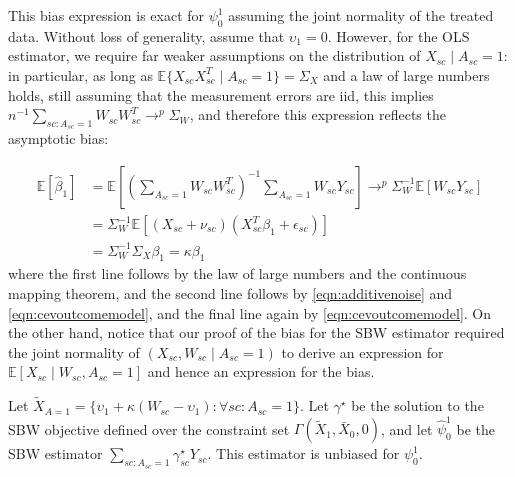 \begin{remark}  
    This bias expression is exact for $\psi_0^1$ assuming the joint normality of the treated data. Without loss of generality, assume that $\upsilon_1 = 0$. However, for the OLS estimator, we require far weaker assumptions on the distribution of $X_{sc} \mid A_{sc} = 1$: in particular, as long as $\mathbb{E}\{X_{sc}X_{sc}^T \mid A_{sc} = 1\} = \Sigma_X$ and a law of large numbers holds, still assuming that the measurement errors are iid, this implies $n^{-1}\sum_{sc: A_{sc} = 1}W_{sc}W_{sc}^T \to^p \Sigma_W$, and therefore this expression reflects the asymptotic bias: 
    
    \begin{align*}
    \mathbb{E}[\hat{\beta}_1] &= \mathbb{E}[(\sum_{A_{sc} = 1}W_{sc}W_{sc}^T)^{-1}\sum_{A_{sc} = 1}W_{sc}Y_{sc}] \to^p \Sigma_W^{-1}\mathbb{E}[W_{sc}Y_{sc}] \\ 
    &= \Sigma_W^{-1}\mathbb{E}[(X_{sc} + \nu_{sc})(X_{sc}^T\beta_1 + \epsilon_{sc})] \\
    &= \Sigma_W^{-1}\Sigma_X\beta_1 = \kappa \beta_1
    \end{align*}
    where the first line follows by the law of large numbers and the continuous mapping theorem, and the second line follows by \eqref{eqn:additivenoise} and \eqref{eqn:cevoutcomemodel}, and the final line again by \eqref{eqn:cevoutcomemodel}. On the other hand, notice that our proof of the bias for the SBW estimator required the joint normality of $(X_{sc}, W_{sc} \mid A_{sc} = 1)$ to derive an expression for $\mathbb{E}[X_{sc} \mid W_{sc}, A_{sc} = 1]$ and hence an expression for the bias.
\end{remark}

\begin{proposition}\label{cl2}
Let $\tilde{X}_{A=1} = \{\upsilon_1 + \kappa (W_{sc} - \upsilon_1): \forall sc: A_{sc} = 1\}$. Let $\gamma^\star$ be the solution to the SBW objective defined over the constraint set $\Gamma(\tilde{X}_1, \bar{X}_0, 0)$, and let $\hat{\psi}^1_0$ be the SBW estimator $\sum_{sc: A_{sc} = 1}\gamma^\star_{sc}Y_{sc}$. This estimator is unbiased for $\psi_0^1$.
\end{proposition}

